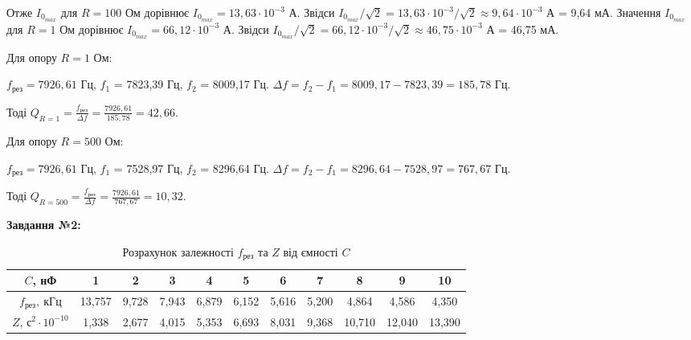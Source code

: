\documentclass[12pt,a4paper]{article}
\begin{document}
    \setlength{\parindent}{1.5em}

    Отже $I_{0_{max}}$ для $R = 100$ Ом дорівнює $I_{0_{max}} = 13,63 \cdot 10^{-3}$ А. Звідси $I_{0_{max}}/\sqrt{2} = 13,63 \cdot 10^{-3}/\sqrt{2} \approx 9,64 \cdot 10^{-3}$ А = 9,64 мА.
    Значення $I_{0_{max}}$ для $R = 1$ Ом дорівнює $I_{0_{max}} = 66,12 \cdot 10^{-3}$ А. Звідси $I_{0_{max}}/\sqrt{2} = 66,12 \cdot 10^{-3}/\sqrt{2} \approx 46,75 \cdot 10^{-3}$ А = 46,75 мА.

    \vspace{1em}

    Для опору $R = 1$ Ом:

    $f_{\text{рез}} = 7926,61$ Гц, $f_1$ = 7823,39 Гц, $f_2$ = 8009,17 Гц. $\Delta f = f_2 - f_1 = 8009,17 - 7823,39 = 185,78$ Гц.

    Тоді $\displaystyle Q_{R = 1} = \frac{f_{\text{рез}}}{\Delta f} = \frac{7926,61}{185,78} = 42,66$.

    Для опору $R = 500$ Ом:

    $f_{\text{рез}} = 7926,61$ Гц, $f_1$ = 7528,97 Гц, $f_2$ = 8296,64 Гц. $\Delta f = f_2 - f_1 = 8296,64 - 7528,97 = 767,67$ Гц.

    Тоді $\displaystyle Q_{R = 500} = \frac{f_{\text{рез}}}{\Delta f} = \frac{7926,61}{767,67} = 10,32$.

    \vspace{2em}
    \setlength{\parindent}{0pt}

    \textbf{\large Завдання №2:}

    \vspace{1em}

    \begin{table}[h!]

        \centering
        \begin{tabular}{|c|*{10}{c|}}
        \hline
        $C$, нФ & 1 & 2 & 3 & 4 & 5 & 6 & 7 & 8 & 9 & 10 \\
        \hline
        $f_{\text{рез}},~\text{кГц}$ & 13,757 & 9,728 & 7,943 & 6,879 & 6,152 & 5,616 & 5,200 & 4,864 & 4,586 & 4,350 \\
        \hline
        $Z$, $\text{с}^2 \cdot 10^{-10}$ & 1,338 & 2,677 & 4,015 & 5,353 & 6,693 & 8,031 & 9,368 & 10,710 & 12,040 & 13,390 \\
        \hline
        \end{tabular}
        \caption{Розрахунок залежності $f_{\text{рез}}$ та $Z$ від ємності $C$}

    \end{table}
\end{document}
